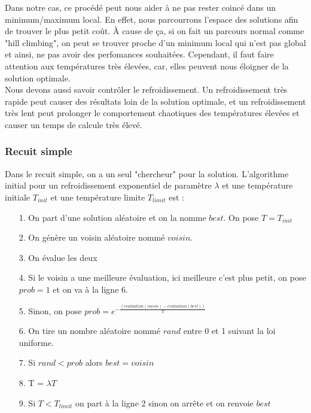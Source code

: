 \documentclass[11pt,french]{report}
\begin{document}
	Dans notre cas, ce procédé peut nous aider à ne pas rester coincé dans un minimum/maximum local. En effet, nous parcourrons l'espace des solutions afin de trouver le plus petit coût. À cause de ça, si on fait un parcours normal comme "hill climbing", on peut se trouver proche d'un minimum local qui n'est pas global et ainsi, ne pas avoir des perfomances souhaitées. Cependant, il faut faire attention aux températures très élevées, car, elles peuvent nous éloigner de la solution optimale.\\
	
	Nous devons aussi savoir contrôler le refroidissement. Un refroidissement très rapide peut causer des résultats loin de la solution optimale, et un refroidissement très lent peut prolonger le comportement chaotiques des températures élevées et causer un temps de calcule très élevé.
	
	\subsubsection{Recuit simple\label{recuit simple}}
	Dans le recuit simple, on a un seul "chercheur" pour la solution. 
	L'algorithme initial pour un refroidissement exponentiel de paramètre $\lambda$ et une température initiale $T_{init}$ et une température limite $T_{limit}$ est :\\
	
	\begin{itemize}
        \item[1.] On part d'une solution aléatoire et on la nomme $best$. On pose $T = T_{init}$
		\item[2.] On génère un voisin aléatoire nommé $voisin$.
		\item[3.] On évalue les deux
		\item[4.] Si le voisin a une meilleure évaluation, ici meilleure c'est plus petit, on pose $prob = 1$ et on va à la ligne 6.
		\item[5.] Sinon, on pose $prob = e^{-\frac{(evaluation(voisin) - evaluation(best))}{T}}$
		\item[6.] On tire un nombre aléatoire nommé $rand$ entre 0 et 1 suivant la loi uniforme.
		\item[7.] Si $rand < prob$ alors $best = voisin$
		\item[8.] T = $\lambda T$
		\item[9.] Si $T<T_{limit}$ on part à la ligne 2 sinon on arrête et on renvoie $best$\\
	\end{itemize}
\end{document}
